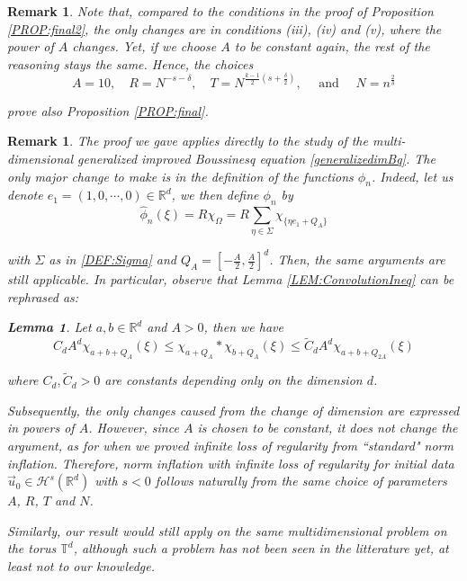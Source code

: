 \documentclass[letterpaper, 11pt,  reqno]{amsart}
\newtheorem{lemma}[theorem]{Lemma}
\newtheorem{remark}[theorem]{Remark}
\newcommand{\1}{\hspace{0.5mm}\text{I}\hspace{0.5mm}}
\newcommand{\noi}{\noindent}
\newcommand{\R}{\mathbb{R}}
\newcommand{\T}{\mathbb{T}}
\renewcommand{\H}{\mathcal{H}}
\newcommand{\dl}{\delta}
\newcommand{\Si}{\Sigma}
\renewcommand{\O}{\Omega}
\numberwithin{equation}{section}
\numberwithin{theorem}{section}
\begin{document}
\begin{remark}
\noi Note that, compared to the conditions in the proof of Proposition \ref{PROP:final2}, the only changes are in conditions (iii), (iv) and (v), where the power of $A$ changes. Yet, if we choose $A$ to be constant again, the rest of the reasoning stays the same. Hence, the choices
$$
A = 10, \quad R = N^{-s-\dl}, \quad T = N^{\frac{k-1}{2}(s + \frac \dl2)}, \quad \text{ and }  \quad N = n^{\frac 2 \dl}
$$

\noi prove also Proposition \ref{PROP:final}.
\end{remark}

\begin{remark} \rm
\label{RK:ProofGenIBq}
The proof we gave applies directly to the study of the multi-dimensional generalized improved Boussinesq equation \eqref{generalizedimBq}. The only major change to make is in the definition of the functions $\phi_n$. Indeed, let us denote $e_1 = (1, 0, \cdots, 0) \in \R^d$, we then define $\phi_n$ by
$$
\widehat{\phi}_n (\xi) = R \chi_\O = R \sum_{\eta \in \Si} \chi_{\{ \eta e_1 + Q_A \}}
$$

\noi with $\Si$ as in \eqref{DEF:Sigma} and $Q_A = [-\frac A2 , \frac A2]^d$. Then, the same arguments are still applicable. In particular, observe that Lemma \ref{LEM:ConvolutionIneq} can be rephrased as:

\begin{lemma}
\label{LEM:ConvolutionIneqInRd}
Let $a,b \in \R^d$ and $A > 0$, then we have
$$
C_d A^d \chi_{a + b + Q_A } (\xi) \leq  \chi_{a + Q_A } \ast \chi_{b + Q_A } (\xi) \leq \widetilde{C}_d A^d \chi_{a + b + Q_{2A}}(\xi )
$$

\noi where $C_d, \widetilde{C}_d > 0$ are constants depending only on the dimension $d$.
\end{lemma}

Subsequently, the only changes caused from the change of dimension are expressed in powers of $A$. However, since $A$ is chosen to be constant, it does not change the argument, as for when we proved infinite loss of regularity from ``standard" norm inflation. Therefore, norm inflation with infinite loss of regularity for initial data $\vec{u}_0 \in \H^s(\R^d)$ with $s<0$ follows naturally from the same choice of parameters $A$, $R$, $T$ and $N$.

Similarly, our result would still apply on the same multidimensional problem on the torus $\T^d$, although such a problem has not been seen in the litterature yet, at least not to our knowledge.
\end{remark}
\end{document}
